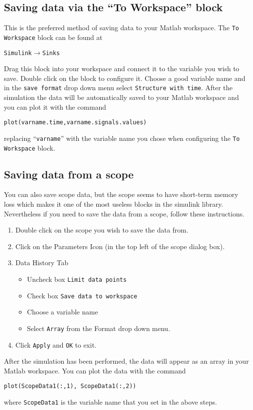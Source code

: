 \subsection{Saving data via the ``To Workspace'' block}

This is the preferred method of saving data to your \textsf{Matlab}
workspace.  The \verb|To Workspace| block can be found at
\begin{center}
\verb|Simulink|$\to$\verb|Sinks|
\end{center}
Drag this block into your workspace and connect it to the variable you wish
to save.  Double click on the block to configure it.  Choose a good variable
name and in the \verb|save format| drop down menu select
\verb|Structure with time|.  After the simulation the data will be
automatically saved to your \textsf{Matlab} workspace and you can plot it
with the command
\begin{center}
\verb|plot(varname.time,varname.signals.values)|
\end{center}
replacing ``\verb|varname|'' with the variable name you chose when
configuring the \verb|To Workspace| block.

\subsection{Saving data from a scope}

You can also save scope data, but the scope seems to have short-term memory
loss which makes it one of the most useless blocks in the simulink library.
Nevertheless if you need to save the data from a scope, follow these
instructions.
\begin{enumerate}
\item Double click on the scope you wish to save the data from.
\item Click on the Parameters Icon (in the top left of the scope dialog box).
\item Data History Tab
\begin{itemize}
\item Uncheck box \verb|Limit data points|
\item Check box \verb|Save data to workspace|
\item Choose a variable name
\item Select \verb|Array| from the Format drop down menu.
\end{itemize}
\item Click \verb|Apply| and \verb|OK| to exit.
\end{enumerate}
After the simulation has been performed, the data will appear as an array in
your \textsf{Matlab} workspace.  You can plot the data with the
command \begin{center}
\verb|plot(ScopeData1(:,1), ScopeData1(:,2))|
\end{center}
where \verb|ScopeData1| is the variable name that you set in the above steps.

